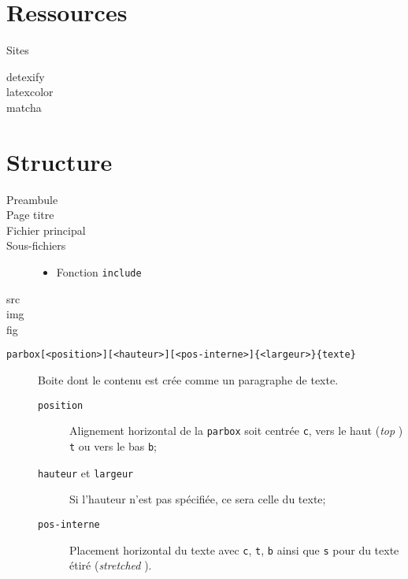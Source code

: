\documentclass[10pt, french]{article}
\begin{document}
\begin{multicols*}{2} 

\section*{Ressources}
\begin{rappel}{Sites}
\begin{description}
	\item[detexify]
	\item[latexcolor]
	\item[matcha]
\end{description}
\end{rappel}


\section*{Structure}
\begin{distributions}[Fichiers]
\begin{description}
	\item[Preambule]
	\item[Page titre]
	\item[Fichier principal]
	\item[Sous-fichiers]
		\begin{itemize}
		\item	Fonction \texttt{include}
		\end{itemize}
\end{description}
\end{distributions}

\begin{distributions}[Dossier]
\begin{description}
	\item[src]
	\item[img]
	\item[fig]
\end{description}
\end{distributions}

\begin{distributions}[Fonctions]
\begin{description}
	\item[\texttt{parbox[<position>][<hauteur>][<pos-interne>]\{<largeur>\}\{texte\}}]	Boite dont le contenu est crée comme un paragraphe de texte.
		\begin{description}
		\item[\texttt{position}]	Alignement horizontal de la \texttt{parbox} soit centrée \texttt{c}, vers le haut (\og \textit{top} \fg{}) \texttt{t} ou vers le bas \texttt{b};
		\item[\texttt{hauteur} et \texttt{largeur}]	Si l'hauteur n'est pas spécifiée, ce sera celle du texte;
		\item[\texttt{pos-interne}]	Placement horizontal du texte avec \texttt{c}, \texttt{t}, \texttt{b} ainsi que \texttt{s} pour du texte étiré (\og \textit{stretched} \fg{}).
		\end{description}
\end{description}
\end{distributions}



\end{multicols*}
\end{document}
